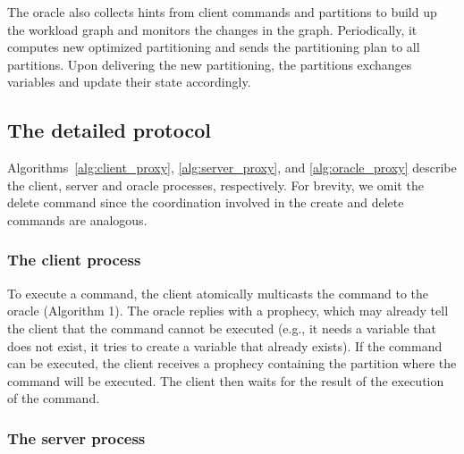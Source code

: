 The oracle also collects hints from client commands and partitions to 
build up the workload graph and monitors the changes in the graph. 
Periodically, it computes new optimized partitioning and sends the 
partitioning plan to all partitions. Upon delivering the new partitioning, 
the partitions exchanges variables and update their state accordingly.

\subsection{The detailed protocol}
\label{sec:detailed}

Algorithms~\ref{alg:client_proxy}, \ref{alg:server_proxy}, and \ref{alg:oracle_proxy} describe the client, server and oracle processes, respectively. 
For brevity, we omit the delete command since the coordination involved in the create and delete commands are analogous. 


\subsubsection{The client process} 

To execute a command, the client atomically multicasts the command to the oracle (Algorithm 1).
The oracle replies with a prophecy, which may already tell the client that the command cannot be executed (e.g., it needs a variable that does not exist, it tries to create a variable that already exists).
If the command can be executed, the client receives a prophecy containing the partition where the command will be executed. The client then waits for the result of the execution of the command.



\subsubsection{The server process} 


